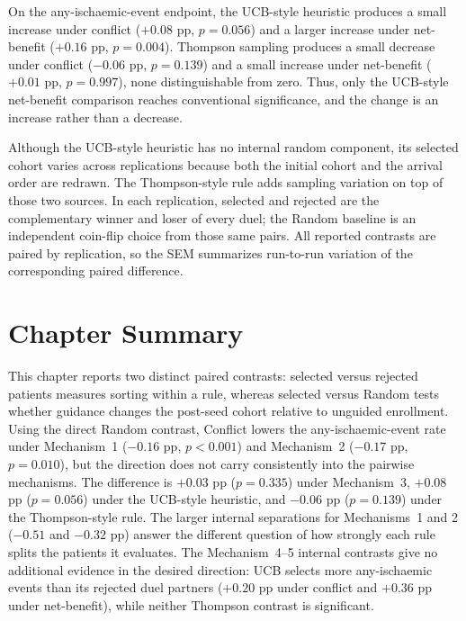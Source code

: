 \vspace{10pt}

On the any-ischaemic-event endpoint, the UCB-style heuristic produces a small increase
under conflict ($+0.08$ pp, $p=0.056$) and a larger increase under net-benefit
($+0.16$ pp, $p=0.004$). Thompson sampling produces a small decrease under conflict
($-0.06$ pp, $p=0.139$) and a small increase under net-benefit ($+0.01$ pp, $p=0.997$),
none distinguishable from zero. Thus, only the UCB-style net-benefit comparison reaches
conventional significance, and the change is an increase rather than a decrease.

\vspace{10pt}

Although the UCB-style heuristic has no internal random component, its selected cohort
varies across replications because both the initial cohort and the arrival order are
redrawn. The Thompson-style rule adds sampling variation on top of those two sources. In
each replication, selected and rejected are the complementary winner and loser of every
duel; the Random baseline is an independent coin-flip choice from those same pairs. All
reported contrasts are paired by replication, so the SEM summarizes run-to-run variation
of the corresponding paired difference.

\vspace{10pt}

\section{Chapter Summary}

This chapter reports two distinct paired contrasts: selected versus rejected patients
measures sorting within a rule, whereas selected versus Random tests whether guidance
changes the post-seed cohort relative to unguided enrollment. Using the direct Random
contrast, Conflict lowers the any-ischaemic-event rate under Mechanism~1 ($-0.16$ pp,
$p<0.001$) and Mechanism~2 ($-0.17$ pp, $p=0.010$), but the direction does not carry
consistently into the pairwise mechanisms. The difference is $+0.03$ pp ($p=0.335$) under
Mechanism~3, $+0.08$ pp ($p=0.056$) under the UCB-style heuristic, and $-0.06$ pp
($p=0.139$) under the Thompson-style rule. The larger internal separations for
Mechanisms~1 and 2 ($-0.51$ and $-0.32$ pp) answer the different question of how strongly
each rule splits the patients it evaluates. The Mechanism~4--5 internal contrasts give no
additional evidence in the desired direction: UCB selects more any-ischaemic events than
its rejected duel partners ($+0.20$ pp under conflict and $+0.36$ pp under net-benefit),
while neither Thompson contrast is significant.

